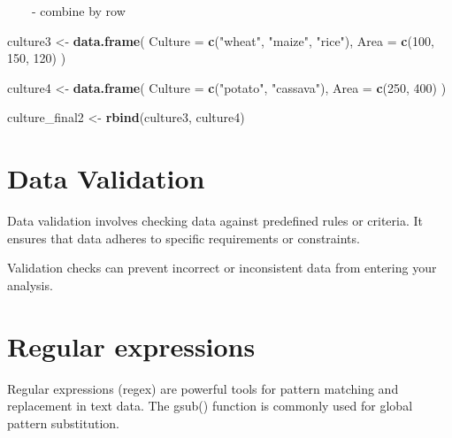 \documentclass[
]{book}
\newenvironment{Shaded}{\begin{snugshade}}{\end{snugshade}}
\newcommand{\AttributeTok}[1]{\textcolor[rgb]{0.13,0.29,0.53}{#1}}
\newcommand{\DecValTok}[1]{\textcolor[rgb]{0.00,0.00,0.81}{#1}}
\newcommand{\FunctionTok}[1]{\textcolor[rgb]{0.13,0.29,0.53}{\textbf{#1}}}
\newcommand{\NormalTok}[1]{#1}
\newcommand{\OtherTok}[1]{\textcolor[rgb]{0.56,0.35,0.01}{#1}}
\newcommand{\SpecialCharTok}[1]{\textcolor[rgb]{0.81,0.36,0.00}{\textbf{#1}}}
\newcommand{\StringTok}[1]{\textcolor[rgb]{0.31,0.60,0.02}{#1}}
\begin{document}
~~~~- combine by row

\begin{Shaded}
\begin{Highlighting}[]
\NormalTok{culture3 }\OtherTok{\textless{}{-}} \FunctionTok{data.frame}\NormalTok{(}
  \AttributeTok{Culture =} \FunctionTok{c}\NormalTok{(}\StringTok{"wheat"}\NormalTok{, }\StringTok{"maize"}\NormalTok{, }\StringTok{"rice"}\NormalTok{),}
  \AttributeTok{Area =} \FunctionTok{c}\NormalTok{(}\DecValTok{100}\NormalTok{, }\DecValTok{150}\NormalTok{, }\DecValTok{120}\NormalTok{)}
\NormalTok{)}

\NormalTok{culture4 }\OtherTok{\textless{}{-}} \FunctionTok{data.frame}\NormalTok{(}
  \AttributeTok{Culture =} \FunctionTok{c}\NormalTok{(}\StringTok{"potato"}\NormalTok{, }\StringTok{"cassava"}\NormalTok{),}
  \AttributeTok{Area =} \FunctionTok{c}\NormalTok{(}\DecValTok{250}\NormalTok{, }\DecValTok{400}\NormalTok{)}
\NormalTok{)}

\NormalTok{culture\_final2 }\OtherTok{\textless{}{-}} \FunctionTok{rbind}\NormalTok{(culture3, culture4)}
\end{Highlighting}
\end{Shaded}

\hypertarget{data-validation}{%
\section{Data Validation}\label{data-validation}}

Data validation involves checking data against predefined rules or criteria. It ensures that data adheres to specific requirements or constraints.

Validation checks can prevent incorrect or inconsistent data from entering your analysis.

\hypertarget{regular-expressions}{%
\section{Regular expressions}\label{regular-expressions}}

Regular expressions (regex) are powerful tools for pattern matching and replacement in text data. The gsub() function is commonly used for global pattern substitution.

\begin{Shaded}
\end{Shaded}
\end{document}
